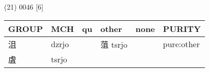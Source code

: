 \documentclass[14pt,a4paper]{scrartcl}
\begin{document}
(21) 0046 {[}6{]}

\begin{longtable}[c]{@{}llllll@{}}
\toprule
\begin{minipage}[b]{0.14\columnwidth}\raggedright\strut
GROUP
\strut\end{minipage} &
\begin{minipage}[b]{0.14\columnwidth}\raggedright\strut
MCH
\strut\end{minipage} &
\begin{minipage}[b]{0.14\columnwidth}\raggedright\strut
qu
\strut\end{minipage} &
\begin{minipage}[b]{0.14\columnwidth}\raggedright\strut
other
\strut\end{minipage} &
\begin{minipage}[b]{0.14\columnwidth}\raggedright\strut
none
\strut\end{minipage} &
\begin{minipage}[b]{0.14\columnwidth}\raggedright\strut
PURITY
\strut\end{minipage}\tabularnewline
\midrule
\endhead
\begin{minipage}[t]{0.14\columnwidth}\raggedright\strut
沮
\strut\end{minipage} &
\begin{minipage}[t]{0.14\columnwidth}\raggedright\strut
dzrjo
\strut\end{minipage} &
\begin{minipage}[t]{0.14\columnwidth}\raggedright\strut
\strut\end{minipage} &
\begin{minipage}[t]{0.14\columnwidth}\raggedright\strut
菹 tsrjo
\strut\end{minipage} &
\begin{minipage}[t]{0.14\columnwidth}\raggedright\strut
\strut\end{minipage} &
\begin{minipage}[t]{0.14\columnwidth}\raggedright\strut
pure:other
\strut\end{minipage}\tabularnewline
\begin{minipage}[t]{0.14\columnwidth}\raggedright\strut
虘
\strut\end{minipage} &
\begin{minipage}[t]{0.14\columnwidth}\raggedright\strut
tsrjo
\strut\end{minipage} &
\begin{minipage}[t]{0.14\columnwidth}\raggedright\strut
\strut\end{minipage} &

\end{longtable}
\end{document}
